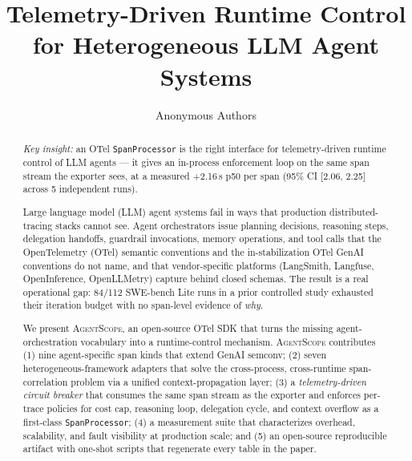 \documentclass[sigplan,10pt,anonymous,review]{acmart}
\newcommand{\sysname}{\textsc{AgentScope}\xspace}
\begin{document}
\title[Telemetry-Driven Runtime Control for LLM Agents]{Telemetry-Driven Runtime Control for Heterogeneous LLM Agent Systems}

\author{Anonymous Authors}

\renewcommand{\shortauthors}{Anonymous Authors}

\begin{abstract}
\emph{Key insight:} an OTel \texttt{SpanProcessor} is the right
interface for telemetry-driven runtime control of LLM agents --- it
gives an in-process enforcement loop on the same span stream the
exporter sees, at a measured +2.16\,\textmu{}s p50 per span (95\% CI
[2.06, 2.25] across 5 independent runs).

Large language model (LLM) agent systems fail in ways that production
distributed-tracing stacks cannot see. Agent orchestrators issue planning
decisions, reasoning steps, delegation handoffs, guardrail invocations,
memory operations, and tool calls that the OpenTelemetry (OTel) semantic
conventions and the in-stabilization OTel GenAI conventions do not name,
and that vendor-specific platforms (LangSmith, Langfuse, OpenInference,
OpenLLMetry) capture behind closed schemas. The result is a real
operational gap: 84/112 SWE-bench Lite runs in a prior controlled study
exhausted their iteration budget with no span-level evidence of
\emph{why}.

We present \sysname, an open-source OTel SDK that turns the missing
agent-orchestration vocabulary into a runtime-control mechanism. \sysname
contributes (1) nine agent-specific span kinds that extend GenAI semconv;
(2) seven heterogeneous-framework adapters that solve the cross-process,
cross-runtime span-correlation problem via a unified context-propagation
layer; (3) a \emph{telemetry-driven circuit breaker} that consumes the
same span stream as the exporter and enforces per-trace policies for
cost cap, reasoning loop, delegation cycle, and context overflow as a
first-class \texttt{SpanProcessor}; (4) a measurement suite that
characterizes overhead, scalability, and fault visibility at production
scale; and (5) an open-source reproducible artifact with one-shot
scripts that regenerate every table in the paper.


\end{abstract}
\end{document}
